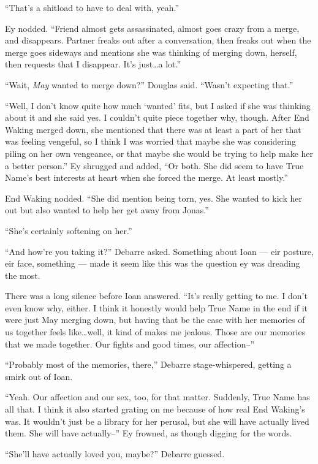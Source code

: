 ``That's a shitload to have to deal with, yeah.''

Ey nodded. ``Friend almost gets assassinated, almost goes crazy from a merge, and disappears. Partner freaks out after a conversation, then freaks out when the merge goes sideways and mentions she was thinking of merging down, herself, then requests that I disappear. It's just\ldots a lot.''

``Wait, \emph{May} wanted to merge down?'' Douglas said. ``Wasn't expecting that.''

``Well, I don't know quite how much `wanted' fits, but I asked if she was thinking about it and she said yes. I couldn't quite piece together why, though. After End Waking merged down, she mentioned that there was at least a part of her that was feeling vengeful, so I think I was worried that maybe she was considering piling on her own vengeance, or that maybe she would be trying to help make her a better person.'' Ey shrugged and added, ``Or both. She did seem to have True Name's best interests at heart when she forced the merge. At least mostly.''

End Waking nodded. ``She did mention being torn, yes. She wanted to kick her out but also wanted to help her get away from Jonas.''

``She's certainly softening on her.''

``And how're you taking it?'' Debarre asked. Something about Ioan — eir posture, eir face, something — made it seem like this was the question ey was dreading the most.

There was a long silence before Ioan answered. ``It's really getting to me. I don't even know why, either. I think it honestly would help True Name in the end if it were just May merging down, but having that be the case with her memories of us together feels like\ldots well, it kind of makes me jealous. Those are our memories that we made together. Our fights and good times, our affection--''

``Probably most of the memories, there,'' Debarre stage-whispered, getting a smirk out of Ioan.

``Yeah. Our affection and our sex, too, for that matter. Suddenly, True Name has all that. I think it also started grating on me because of how real End Waking's was. It wouldn't just be a library for her perusal, but she will have actually lived them. She will have actually--'' Ey frowned, as though digging for the words.

``She'll have actually loved you, maybe?'' Debarre guessed.

